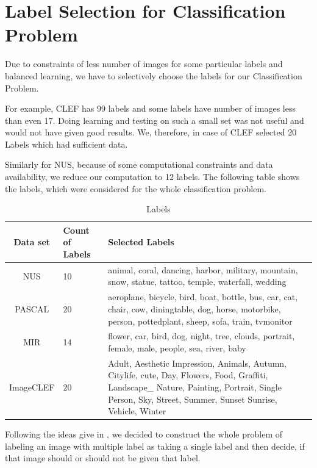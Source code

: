 \vspace*{1cm}
\section{Label Selection for Classification Problem}
Due to constraints of less number of images for some particular labels and balanced learning, we have to selectively 
choose the labels for our Classification Problem. 

For example, CLEF has 99 labels and some labels have number of images less than even 17. Doing learning and testing on such a small set was not useful and would not have given good results. We, therefore, in case of CLEF selected 20 Labels which had sufficient data.

Similarly for NUS, because of some computational constraints and data availability, we reduce our computation to 12 labels. The following table shows the labels, which were considered for the whole classification problem. 

\begin{table}[ht]
\caption{Labels} %
\centering %
\begin{tabular}{|c|p{2cm}|p{7cm}| } %
\hline\hline %
Data set & Count of Labels & Selected Labels \\ [0.5ex] \hline%
\hline %
NUS & 10 & animal, coral, dancing, harbor, military, mountain, snow, statue, tattoo, temple, waterfall, wedding \\  [1ex] \hline
PASCAL & 20 & aeroplane, bicycle, bird, boat, bottle, bus, car, cat, chair, cow, diningtable, dog, horse, motorbike, person, pottedplant, sheep, sofa, train, tvmonitor \\  [1ex] \hline
MIR & 14 & flower, car, bird, dog, night, tree, clouds, portrait, female, male, people, sea, river, baby \\  [1ex] \hline
ImageCLEF & 20 & Adult, Aesthetic Impression, Animals, Autumn, Citylife, cute, Day, Flowers, Food, Graffiti, Landscape\_ Nature, Painting, Portrait, Single Person, Sky, Street, Summer, Sunset Sunrise, Vehicle, Winter \\  [1ex] \hline
\hline %
\end{tabular}
\label{table:nonlin} %
\end{table}
Following the ideas give in \citet*{Jure}, we decided to construct the whole problem of labeling an image with multiple label as taking a single label and then decide, if that image should or should not be given that label. 

